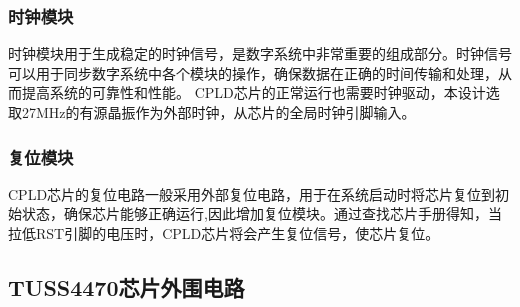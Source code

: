     \subsubsection{时钟模块}
    时钟模块用于生成稳定的时钟信号，是数字系统中非常重要的组成部分。时钟信号可以用于同步数字系统中各个模块的操作，确保数据在正确的时间传输和处理，从而提高系统的可靠性和性能。
    CPLD芯片的正常运行也需要时钟驱动，本设计选取27MHz的有源晶振作为外部时钟，从芯片的全局时钟引脚输入。
    
    \subsubsection{复位模块}
   CPLD芯片的复位电路一般采用外部复位电路，用于在系统启动时将芯片复位到初始状态，确保芯片能够正确运行,因此增加复位模块。通过查找芯片手册得知，当拉低RST引脚的电压时，CPLD芯片将会产生复位信号，使芯片复位。
   
    
    \newpage
    \subsection{TUSS4470芯片外围电路}
    
